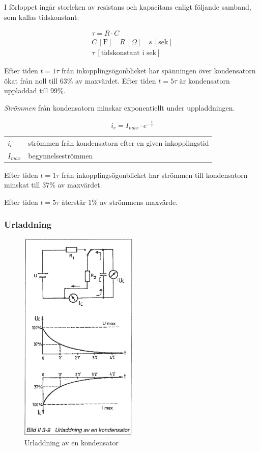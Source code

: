 I förloppet ingår storleken av resistans och kapacitans enligt följande samband,
som kallas tidskonstant:

\begin{gather*}
  \tau = R \cdot C \\
  C\ [\text{F}] \quad R\ [Ω] \quad s\ [\text{sek}] \\
  \tau\ [\text{tidskonstant i sek}]
\end{gather*}

Efter tiden \(t = 1\tau\) från inkopplingsögonblicket har spänningen över
kondensatorn ökat från noll till 63\% av maxvärdet. Efter tiden \(t = 5\tau\)
är kondensatorn uppladdad till 99\%.

\emph{Strömmen} från kondensatorn minskar exponentiellt under uppladdningen.

\[i_c = I_{max} \cdot e^{-\frac{t}{\tau}}\]

\begin{tabular}{lp{}}
  \(i_c\) & strömmen från kondensatorn efter en given inkopplingstid \\
  \(I_{max}\) & begynnelseströmmen \\
\end{tabular}

Efter tiden \(t = 1\tau\) från inkopplingsögonblicket har strömmen till
kondensatorn minskat till 37\% av maxvärdet.

Efter tiden \(t = 5\tau\) återstår 1\% av strömmens maxvärde.

\subsubsection{Urladdning}

\begin{figure}
\includegraphics[width=0.5\textwidth]{images/bild_2_3-09}
\caption{Urladdning av en kondensator}
\label{fig:BildII3-09}
\end{figure}

